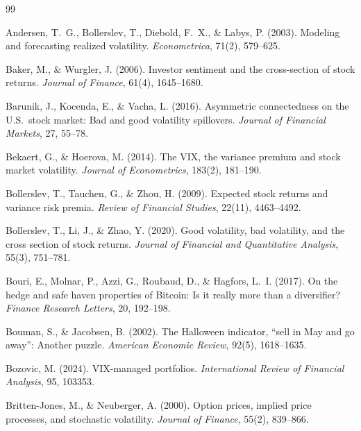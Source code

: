 \documentclass[12pt,a4paper]{article}
\begin{document}
\newpage

\begin{thebibliography}{99}

Andersen, T.~G., Bollerslev, T., Diebold, F.~X., \& Labys, P. (2003). Modeling and forecasting realized volatility. \textit{Econometrica}, 71(2), 579--625.

Baker, M., \& Wurgler, J. (2006). Investor sentiment and the cross-section of stock returns. \textit{Journal of Finance}, 61(4), 1645--1680.

Barunik, J., Kocenda, E., \& Vacha, L. (2016). Asymmetric connectedness on the U.S.\ stock market: Bad and good volatility spillovers. \textit{Journal of Financial Markets}, 27, 55--78.

Bekaert, G., \& Hoerova, M. (2014). The VIX, the variance premium and stock market volatility. \textit{Journal of Econometrics}, 183(2), 181--190.

Bollerslev, T., Tauchen, G., \& Zhou, H. (2009). Expected stock returns and variance risk premia. \textit{Review of Financial Studies}, 22(11), 4463--4492.

Bollerslev, T., Li, J., \& Zhao, Y. (2020). Good volatility, bad volatility, and the cross section of stock returns. \textit{Journal of Financial and Quantitative Analysis}, 55(3), 751--781.

Bouri, E., Molnar, P., Azzi, G., Roubaud, D., \& Hagfors, L.~I. (2017). On the hedge and safe haven properties of Bitcoin: Is it really more than a diversifier? \textit{Finance Research Letters}, 20, 192--198.

Bouman, S., \& Jacobsen, B. (2002). The Halloween indicator, ``sell in May and go away'': Another puzzle. \textit{American Economic Review}, 92(5), 1618--1635.

Bozovic, M. (2024). VIX-managed portfolios. \textit{International Review of Financial Analysis}, 95, 103353.

Britten-Jones, M., \& Neuberger, A. (2000). Option prices, implied price processes, and stochastic volatility. \textit{Journal of Finance}, 55(2), 839--866.


\end{thebibliography}
\end{document}
